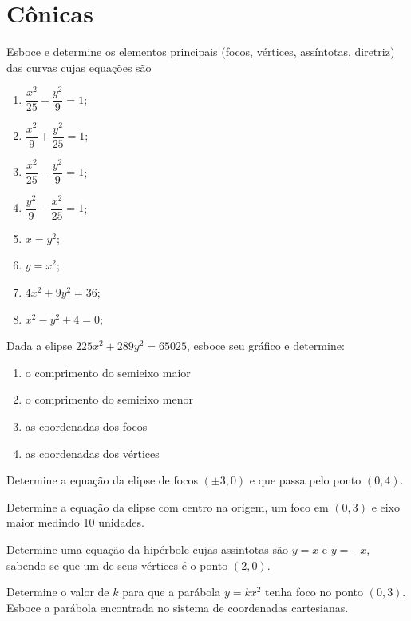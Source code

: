 



\section{Cônicas}

\item
 Esboce e determine os elementos principais (focos, vértices, assíntotas, diretriz) das curvas cujas equa\c{c}\~oes s\~ao
\begin{multicols}{02}
  \begin{enumerate}[leftmargin=*]
  \item[a)] $\dfrac{x^2}{25}+\dfrac{y^2}{9}=1$;
  \item[b)] $\dfrac{x^2}{9}+\dfrac{y^2}{25}=1$;
  \item[c)] $\dfrac{x^2}{25}-\dfrac{y^2}{9}=1$;
  \item[d)] $\dfrac{y^2}{9}-\dfrac{x^2}{25}=1$;
  \item[e)] $x=y^2$;
  \item[f)] $y=x^2$;
  \item[g)] $4x^2+9y^2=36$;
  \item[h)] $x^2-y^2+4=0$;
  \end{enumerate}
\end{multicols}
\item Dada a elipse $225x^2 + 289y^2=65025$, esboce seu gráfico e determine:
\begin{multicols}{02}
 \begin{enumerate}[leftmargin=*]
 \item o comprimento do semieixo maior
 \item o comprimento do semieixo menor
 \item as coordenadas dos focos
 \item as coordenadas dos vértices
 \end{enumerate}
 \end{multicols}
\item Determine a equação da elipse de focos $(\pm 3,0)$ e que passa pelo ponto $(0,4)$.
\item Determine a equação da elipse com centro na origem, um foco em $(0,3)$ e eixo maior medindo 10 unidades. 
\item
  Determine uma equação da hipérbole cujas assintotas s\~ao $y=x$ e $y=-x$, sabendo-se que um de seus vértices \'e o ponto $(2, 0)$.
  
 \item Determine o valor de $k$ para que a parábola $y=kx^2$ tenha foco no ponto $(0,3)$. Esboce a parábola encontrada no sistema de coordenadas cartesianas.
  
